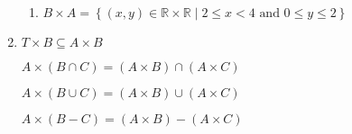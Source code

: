 \begin{enumerate}
\begin{enumerate}
\item $B \times A = \left\{ {\left( {x,y} \right) \in \mathbb{R} \times \mathbb{R} \mid {2 \leq x < 4 \text{ and } 0 \leq y \leq 2} } \right\}$
\end{enumerate}

\item 
$T \times B \subseteq A \times B$

$A \times \left( {B \cap C} \right) = \left( {A \times B} \right) \cap \left( {A \times C} \right)$

$A \times \left( {B \cup C} \right) = \left( {A \times B} \right) \cup \left( {A \times C} \right)$

$A \times \left( {B - C} \right) = \left( {A \times B} \right) - \left( {A \times C} \right)$

\end{enumerate}
\hbreak



\endinput
